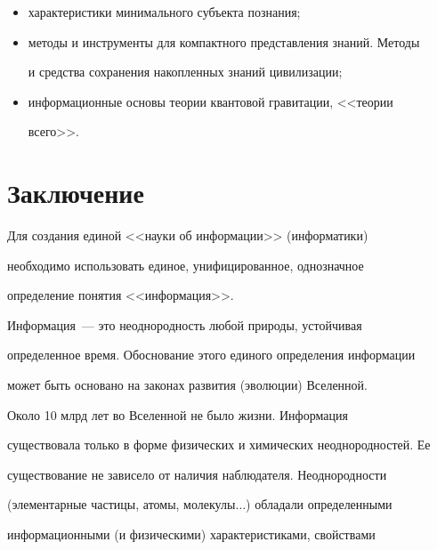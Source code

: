 \begin{itemize}
цивилизации Вселенной;


   \item 


   характеристики минимального субъекта познания;


   \item 


   методы и инструменты для компактного представления знаний. Методы 


и средства сохранения накопленных знаний цивилизации;


   \item 


   информационные основы теории квантовой гравитации, <<теории 


всего>>.


\end{itemize}


   


   \section{Заключение}





   Для создания единой <<науки об информации>> (информатики) 


необходимо использовать единое, унифицированное, однозначное 


определение понятия <<информация>>.


   


   Информация~--- это неоднородность любой природы, устойчивая 


определенное время. Обоснование этого единого определения информации 


может быть основано на законах развития (эволюции) Вселенной.


   


   Около 10 млрд лет во Вселенной не было жизни. Информация 


существовала только в форме физических и химических неоднородностей. Ее 


существование не зависело от наличия наблюдателя. Неоднородности 


(элементарные частицы, атомы, молекулы$\ldots$) обладали определенными 


информационными (и физическими) характеристиками, свойствами 



